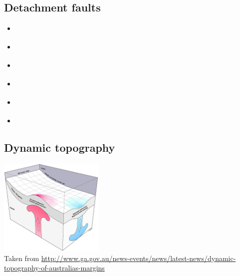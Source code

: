 \subsection{Detachment faults} 

\begin{scriptsize}
\begin{itemize}
\item[\twothousandseven]     
\textcite{werr07} 
\item[\twothousandten]       
\textcite{jaml10} 
\item[\twothousandeleven]    
\textcite{rera11} 
\item[\twothousandfifteen]   
\textcite{matv15} 
\item[\twothousandnineteen]  
\textcite{gubg19} 
\item[\twothousandtwentyone] 
\textcite{sabg21} 
\end{itemize}
\end{scriptsize}

\subsection{Dynamic topography} 

\begin{center}
\includegraphics[width=5cm]{images/dyntopo/dyntopo.jpg}\\
{\captionfont Taken from \url{http://www.ga.gov.au/news-events/news/latest-news/dynamic-topography-of-australias-margins}}
\end{center}

